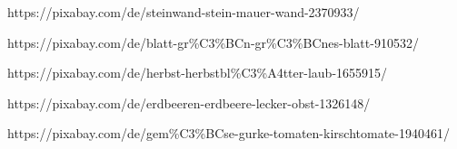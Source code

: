 \documentclass{Paper}
\begin{document}
\begin{appendix}
https://pixabay.com/de/steinwand-stein-mauer-wand-2370933/



https://pixabay.com/de/blatt-gr\%C3\%BCn-gr\%C3\%BCnes-blatt-910532/



https://pixabay.com/de/herbst-herbstbl\%C3\%A4tter-laub-1655915/



https://pixabay.com/de/erdbeeren-erdbeere-lecker-obst-1326148/



https://pixabay.com/de/gem\%C3\%BCse-gurke-tomaten-kirschtomate-1940461/

\end{appendix}

\vfill %
\end{document}
